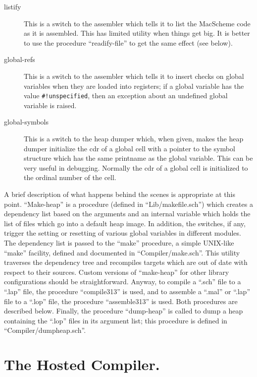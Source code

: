 \begin{description}
\item[listify] This is a switch to the assembler which tells it to list
the MacScheme code as it is assembled. This has limited utility when things
get big. It is better to use the procedure ``readify-file'' to get the same
effect (see below).

\item[global-refs] This is a switch to the assembler which tells it to
insert checks on global variables when they are loaded into registers; if
a global variable has the value \verb+#!unspecified+, then an exception
about an undefined global variable is raised.

\item[global-symbols] This is a switch to the heap dumper which, when given,
makes the heap dumper initialize the cdr of a global cell with a pointer
to the symbol structure which has the same printname as the global variable.
This can be very useful in debugging. Normally the cdr of a global cell is
initialized to the ordinal number of the cell.

\end{description}

A brief description of what happens behind the scenes is appropriate at this
point. ``Make-heap'' is a procedure (defined in ``Lib/makefile.sch'') which
creates a dependency list based on the arguments and an internal variable
which holds the list of files which go into a default heap image. In
addition, the switches, if any, trigger the setting or resetting of various
global variables in different modules. The dependency list is passed to the
``make'' procedure, a simple UNIX-like ``make'' facility, defined and
documented in ``Compiler/make.sch''. This utility traverses the dependency
tree and recompiles targets which are out of date with respect to their
sources.  Custom versions of ``make-heap'' for other library configurations
should be straightforward. Anyway, to compile a ``.sch'' file to a ``.lap''
file, the procedure ``compile313'' is used, and to assemble a ``.mal'' or
``.lap'' file to a ``.lop'' file, the procedure ``assemble313'' is used.
Both procedures are described below. Finally, the procedure ``dump-heap'' is
called to dump a heap containing the ``.lop'' files in its argument list;
this procedure is defined in ``Compiler/dumpheap.sch''.

\section{The Hosted Compiler.}

